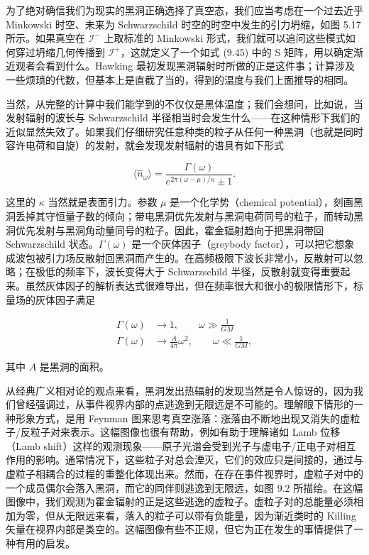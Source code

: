 为了绝对确信我们为现实的黑洞正确选择了真空态，我们应当考虑在一个过去近乎 Minkowski 时空、未来为 Schwarzschild 时空的时空中发生的引力坍缩，如图 5.17 所示。如果真空在 $\mathscr{I}^{-}$ 上取标准的 Minkowski 形式，我们就可以追问这些模式如何穿过坍缩几何传播到 $\mathscr{I}^{+}$，这就定义了一个如式 (9.45) 中的 S 矩阵，用以确定渐近观者会看到什么。Hawking 最初发现黑洞辐射时所做的正是这件事；计算涉及一些烦琐的代数，但基本上是直截了当的，得到的温度与我们上面推导的相同。

当然，从完整的计算中我们能学到的不仅仅是黑体温度；我们会想问，比如说，当发射辐射的波长与 Schwarzschild 半径相当时会发生什么——在这种情形下我们的近似显然失效了。如果我们仔细研究任意种类的粒子从任何一种黑洞（也就是同时容许电荷和自旋）的发射，就会发现发射辐射的谱具有如下形式

\begin{equation*}
\langle \hat{n}_{\omega} \rangle = \frac{\Gamma(\omega)}{e^{2\pi(\omega - \mu)/\kappa} \pm 1}.
\tag{9.174}
\end{equation*}

这里的 $\kappa$ 当然就是表面引力。参数 $\mu$ 是一个化学势（chemical potential），刻画黑洞丢掉其守恒量子数的倾向；带电黑洞优先发射与黑洞电荷同号的粒子，而转动黑洞优先发射与黑洞角动量同号的粒子。因此，霍金辐射趋向于把黑洞带回 Schwarzschild 状态。$\Gamma(\omega)$ 是一个灰体因子（greybody factor），可以把它想象成波包被引力场反散射回黑洞而产生的。在高频极限下波长非常小，反散射可以忽略；在极低的频率下，波长变得大于 Schwarzschild 半径，反散射就变得重要起来。虽然灰体因子的解析表达式很难导出，但在频率很大和很小的极限情形下，标量场的灰体因子满足

\begin{align*}
\Gamma(\omega) &\to 1, \qquad \omega \gg \frac{1}{GM} \\
\Gamma(\omega) &\to \frac{A}{4\pi} \omega^{2}, \qquad \omega \ll \frac{1}{GM},
\tag{9.175}
\end{align*}

其中 $A$ 是黑洞的面积。

从经典广义相对论的观点来看，黑洞发出热辐射的发现当然是令人惊讶的，因为我们曾经强调过，从事件视界内部的点逃逸到无限远是不可能的。理解眼下情形的一种形象方式，是用 Feynman 图来思考真空涨落：涨落由不断地出现又消失的虚粒子/反粒子对来表示。这幅图像也很有帮助，例如有助于理解诸如 Lamb 位移（Lamb shift）这样的观测现象——原子光谱会受到光子与虚电子/正电子对相互作用的影响。通常情况下，这些粒子对总会湮灭，它们的效应只是间接的，通过与虚粒子相耦合的过程的重整化体现出来。然而，在存在事件视界时，虚粒子对中的一个成员偶尔会落入黑洞，而它的同伴则逃逸到无限远，如图 9.2 所描绘。在这幅图像中，我们观测为霍金辐射的正是这些逃逸的虚粒子。虚粒子对的总能量必须相加为零，但从无限远来看，落入的粒子可以带有负能量，因为渐近类时的 Killing 矢量在视界内部是类空的。这幅图像有些不正规，但它为正在发生的事情提供了一种有用的启发。

